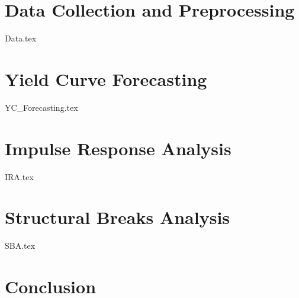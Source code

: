 \documentclass{vegaarticle}
\begin{document}
    \section{Data Collection and Preprocessing}
        {Data.tex}
    
    \section{Yield Curve Forecasting}
        {YC_Forecasting.tex}
    
    \section{Impulse Response Analysis}
        {IRA.tex}

    \section{Structural Breaks Analysis}
        {SBA.tex}

    \section{Conclusion}
\end{document}
